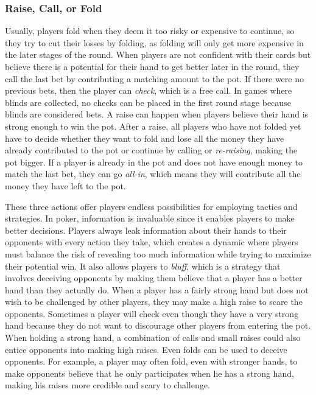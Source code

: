 \subsubsection{Raise, Call, or Fold}
Usually, players fold when they deem it too risky or expensive to continue, so they try to cut their losses by folding, as folding will only get more expensive in the later stages of the round. When players are not confident with their cards but believe there is a potential for their hand to get better later in the round, they call the last bet by contributing a matching amount to the pot. If there were no previous bets, then the player can \textit{check}, which is a free call. In games where blinds are collected, no checks can be placed in the first round stage because blinds are considered bets. A raise can happen when players believe their hand is strong enough to win the pot. After a raise, all players who have not folded yet have to decide whether they want to fold and lose all the money they have already contributed to the pot or continue by calling or \textit{re-raising}, making the pot bigger. If a player is already in the pot and does not have enough money to match the last bet, they can go \textit{all-in}, which means they will contribute all the money they have left to the pot.

These three actions offer players endless possibilities for employing tactics and strategies. In poker, information is invaluable since it enables players to make better decisions. Players always leak information about their hands to their opponents with every action they take, which creates a dynamic where players must balance the risk of revealing too much information while trying to maximize their potential win. It also allows players to \textit{bluff}, which is a strategy that involves deceiving opponents by making them believe that a player has a better hand than they actually do. When a player has a fairly strong hand but does not wish to be challenged by other players, they may make a high raise to scare the opponents. Sometimes a player will check even though they have a very strong hand because they do not want to discourage other players from entering the pot. When holding a strong hand, a combination of calls and small raises could also entice opponents into making high raises. Even folds can be used to deceive opponents. For example, a player may often fold, even with stronger hands, to make opponents believe that he only participates when he has a strong hand, making his raises more credible and scary to challenge. 

